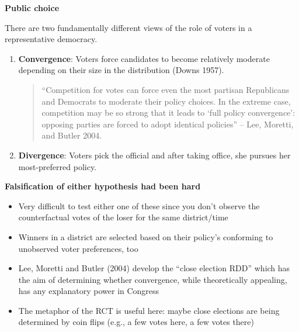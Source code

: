 \documentclass[notes=show]{beamer}
\begin{document}
\begin{frame}[plain]
\begin{center}
\textbf{Public choice}
\end{center}

There are two fundamentally different views of the role of voters in a representative democracy.
		\begin{enumerate}
		\item \textbf{Convergence}: Voters force candidates to become relatively moderate depending on their size in the distribution (Downs 1957).  \begin{quote}``Competition for votes can force even the most partisan Republicans and Democrats to moderate their policy choices. In the extreme case, competition may be so strong that it leads to `full policy convergence': opposing parties are forced to adopt identical policies'' -- Lee, Moretti, and Butler 2004.\end{quote}
		\item \textbf{Divergence}: Voters pick the official and after taking office, she pursues her most-preferred policy.  
		\end{enumerate}

\end{frame}


\begin{frame}[plain]
\begin{center}
\textbf{Falsification of either hypothesis had been hard}
\end{center}

\begin{itemize}
\item Very difficult to test either one of these since you don't observe the counterfactual votes of the loser for the same district/time
\item Winners in a district are selected based on their policy's conforming to unobserved voter preferences, too
\item Lee, Moretti and Butler (2004) develop the ``close election RDD'' which has the aim of determining whether convergence, while theoretically appealing, has any explanatory power in Congress
\item The metaphor of the RCT is useful here: maybe close elections are being determined by coin flips (e.g., a few votes here, a few votes there)
\end{itemize}

\end{frame}
\end{document}
